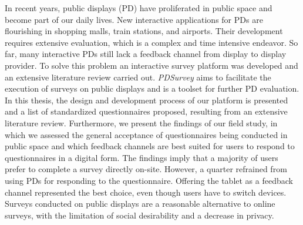 	In recent years, public displays (PD) have proliferated in public space and become part of our daily lives. New interactive applications for PDs are flourishing in shopping malls, train stations, and airports. Their development requires extensive evaluation, which is a complex and time intensive endeavor. So far, many interactive PDs still lack a feedback channel from display to display provider. To solve this problem an interactive survey platform was developed and an extensive literature review carried out.
	\textit{PDSurvey} aims to facilitate the execution of surveys on public displays and is a toolset for further PD evaluation. In this thesis, the design and development process of our platform is presented and a list of standardized questionnaires proposed, resulting from an extensive literature review. Furthermore, we present the findings of our field study, in which we assessed the general acceptance of questionnaires being conducted in public space and which feedback channels are best suited for users to respond to questionnaires in a digital form.
	The findings imply that a majority of users prefer to complete a survey directly on-site. However, a quarter refrained from using PDs for responding to the questionnaire. Offering the tablet as a feedback channel represented the best choice, even though users have to switch devices. Surveys conducted on public displays are a reasonable alternative to online surveys, with the limitation of social desirability and a decrease in privacy.
	





